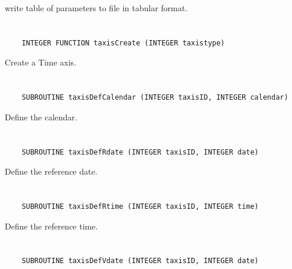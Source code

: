 write table of parameters to file in tabular format.


\section*{\tt {}}

\begin{verbatim}
    INTEGER FUNCTION taxisCreate (INTEGER taxistype)
\end{verbatim}

Create a Time axis.


\section*{\tt {}}

\begin{verbatim}
    SUBROUTINE taxisDefCalendar (INTEGER taxisID, INTEGER calendar)
\end{verbatim}

Define the calendar.


\section*{\tt {}}

\begin{verbatim}
    SUBROUTINE taxisDefRdate (INTEGER taxisID, INTEGER date)
\end{verbatim}

Define the reference date.


\section*{\tt {}}

\begin{verbatim}
    SUBROUTINE taxisDefRtime (INTEGER taxisID, INTEGER time)
\end{verbatim}

Define the reference time.


\section*{\tt {}}

\begin{verbatim}
    SUBROUTINE taxisDefVdate (INTEGER taxisID, INTEGER date)
\end{verbatim}

